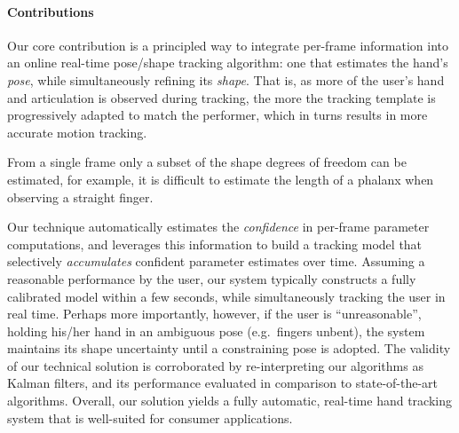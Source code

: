 \paragraph{Contributions}
Our core contribution is a principled way to integrate per-frame information into an online real-time pose/shape tracking algorithm: one that estimates the hand's \emph{pose}, while simultaneously refining its \emph{shape}. That is, as more of the user's hand and articulation is observed during tracking, the more the tracking template is progressively adapted to match the performer, which in turns results in more accurate motion tracking. 
\begin{edit}
From a single frame only a subset of the shape degrees of freedom can be estimated, for example, it is difficult to estimate the length of a phalanx when observing a straight finger.
\end{edit}
Our technique automatically estimates the \emph{confidence} in per-frame parameter computations, and leverages this information to build a tracking model that selectively \emph{accumulates} confident parameter estimates over time. Assuming a reasonable performance by the user, our system typically constructs a fully calibrated model within a few seconds, while simultaneously tracking the user in real time.  Perhaps more importantly, however, if the user is ``unreasonable'', holding his/her hand in an ambiguous pose (e.g.~fingers unbent), the system maintains its shape uncertainty until a constraining pose is adopted.
The validity of our technical solution is corroborated by re-interpreting our algorithms as Kalman filters, 
and its performance evaluated in comparison to state-of-the-art algorithms. Overall, our solution yields a fully automatic, real-time hand tracking system that is well-suited for consumer applications.
